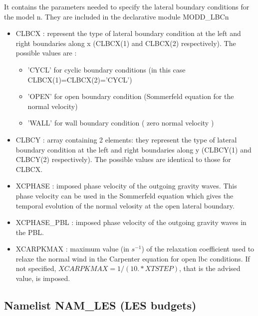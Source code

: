 It contains the parameters needed to specify the lateral boundary conditions for
the model n. They are
included in the declarative module MODD\_LBCn
\begin{itemize}
\item
{}
CLBCX : represent the type of lateral boundary
condition at the left and right boundaries along x (CLBCX(1) and CLBCX(2)
respectively). The possible values are : 
\begin{itemize}
\item 
'CYCL' for cyclic boundary  conditions (in this case CLBCX(1)=CLBCX(2)='CYCL')
\item 
'OPEN' for open boundary condition (Sommerfeld equation for the normal velocity)
\item 
'WALL' for wall boundary   condition ( zero normal velocity )
\end{itemize}
 
\item
{}
CLBCY : array containing 2 elements: they represent the type of lateral boundary
condition at the left and right boundaries along y (CLBCY(1) and CLBCY(2)
respectively). The possible values are identical to those for CLBCX. 

\item
{}
XCPHASE : imposed phase velocity of the outgoing gravity waves. This phase
velocity can be  used in the Sommerfeld equation which gives the temporal
evolution of the normal velosity at the open lateral boundary.  

\item
{}
XCPHASE\_PBL : imposed phase velocity of the outgoing gravity waves in the PBL. 

\item
{}
XCARPKMAX : maximum value (in $s^{-1}$)  of the relaxation coefficient used to
relaxe the normal wind in the Carpenter equation for open lbc conditions.
If not specified,  $XCARPKMAX=1/(10.* XTSTEP)$, that is the advised value, is imposed.

\end{itemize}
\newpage
\subsection{Namelist NAM\_LES (LES budgets)}                                          
\label{ss:LESbudget}

